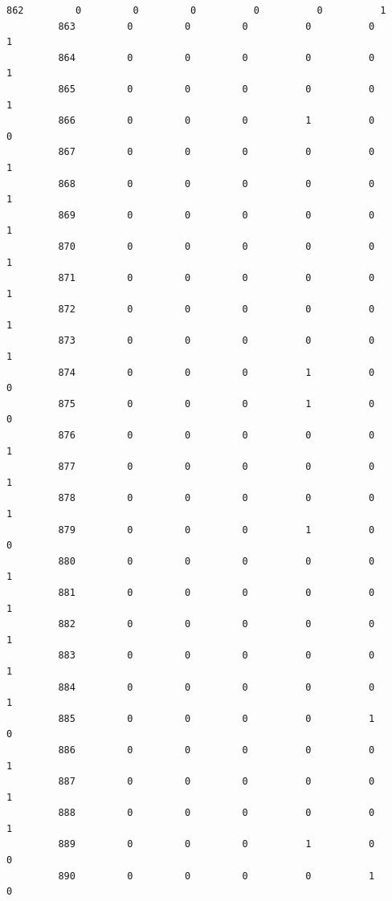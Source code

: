\documentclass[11pt]{article}
\begin{document}
\begin{Verbatim}[commandchars=\\\{\}]
         862         0         0         0          0          0          1   
         863         0         0         0          0          0          1   
         864         0         0         0          0          0          1   
         865         0         0         0          0          0          1   
         866         0         0         0          1          0          0   
         867         0         0         0          0          0          1   
         868         0         0         0          0          0          1   
         869         0         0         0          0          0          1   
         870         0         0         0          0          0          1   
         871         0         0         0          0          0          1   
         872         0         0         0          0          0          1   
         873         0         0         0          0          0          1   
         874         0         0         0          1          0          0   
         875         0         0         0          1          0          0   
         876         0         0         0          0          0          1   
         877         0         0         0          0          0          1   
         878         0         0         0          0          0          1   
         879         0         0         0          1          0          0   
         880         0         0         0          0          0          1   
         881         0         0         0          0          0          1   
         882         0         0         0          0          0          1   
         883         0         0         0          0          0          1   
         884         0         0         0          0          0          1   
         885         0         0         0          0          1          0   
         886         0         0         0          0          0          1   
         887         0         0         0          0          0          1   
         888         0         0         0          0          0          1   
         889         0         0         0          1          0          0   
         890         0         0         0          0          1          0   
         

\end{Verbatim}
\end{document}
